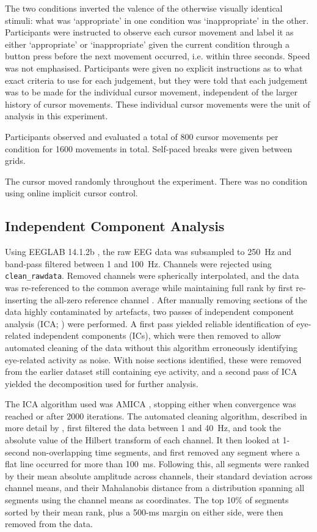The two conditions inverted the valence of the otherwise visually identical stimuli: what was `appropriate' in one condition was `inappropriate' in the other. Participants were instructed to observe each cursor movement and label it as either `appropriate' or `inappropriate' given the current condition through a button press before the next movement occurred, i.e. within three seconds. Speed was not emphasised. Participants were given no explicit instructions as to what exact criteria to use for each judgement, but they were told that each judgement was to be made for the individual cursor movement, independent of the larger history of cursor movements. These individual cursor movements were the unit of analysis in this experiment.

Participants observed and evaluated a total of 800 cursor movements per condition for 1600 movements in total. Self-paced breaks were given between grids.

The cursor moved randomly throughout the experiment. There was no condition using online implicit cursor control.


\subsection{Independent Component Analysis}

Using EEGLAB 14.1.2b \cite{delorme2004eeglab}, the raw EEG data was subsampled to 250~Hz and band-pass filtered between 1 and 100~Hz. Channels were rejected using \texttt{clean\_rawdata}. Removed channels were spherically interpolated, and the data was re-referenced to the common average while maintaining full rank by first re-inserting the all-zero reference channel \cite{miyakoshi2017fullrankaveref}. After manually removing sections of the data highly contaminated by artefacts, two passes of independent component analysis (ICA; ) were performed. A first pass yielded reliable identification of eye-related independent components (ICs), which were then removed to allow automated cleaning of the data without this algorithm erroneously identifying eye-related activity as noise. With noise sections identified, these were removed from the earlier dataset still containing eye activity, and a second pass of ICA yielded the decomposition used for further analysis.

The ICA algorithm used was AMICA \cite{palmer2012amica}, stopping either when convergence was reached or after 2000 iterations. The automated cleaning algorithm, described in more detail by , first filtered the data between 1 and 40~Hz, and took the absolute value of the Hilbert transform of each channel. It then looked at 1-second non-overlapping time segments, and first removed any segment where a flat line occurred for more than 100~ms. Following this, all segments were ranked by their mean absolute amplitude across channels, their standard deviation across channel means, and their Mahalanobis distance from a distribution spanning all segments using the channel means as coordinates. The top 10\% of segments sorted by their mean rank, plus a 500-ms margin on either side, were then removed from the data.

